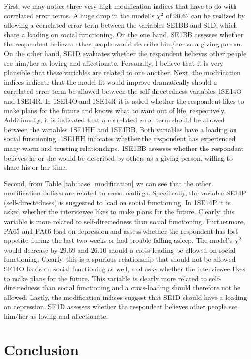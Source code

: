 \documentclass[11pt]{article}
\begin{document}
First, we may notice three very high modification indices that have to do with
correlated error terms.
A huge drop in the model's $\chi^2$ of 90.62 can be realized by allowing a
correlated error term between the variables SE1BB and S1D, which share a loading
on social functioning. On the one hand, SE1BB assesses whether the respondent
believes other people would describe him/her as a giving person. On the other
hand, SE1D evaluates whether the respondent believes other people see him/her as
loving and affectionate. Personally, I believe that it is very plausible that
these variables are related to one another.
Next, the modification indices indicate that the model fit would improve
dramatically should a correlated error term be allowed between the
self-directedness variables 1SE14O and 1SE14R. In 1SE14O and 1SE14R it is asked
whether the respondent likes to make plans for the future and knows what to want
out of life, respectively.
Additionally, it is indicated that a correlated error term
should be allowed between the variables 1SE1HH and 1SE1BB. Both variables have a
loading on social functioning. 1SE1HH indicates whether the respondent has
experienced many warm and trusting relationships. 1SE1BB assesses whether the
respondent believes he or she would be described by others as a giving person,
willing to share his or her time.

Second, from Table \ref{tab:base_modification} we can see that the other
modification indices are related to cross-loadings.
Specifically, the variable SE14P (self-directedness) is suggested to
load on social functioning. In 1SE14P it is asked whether the interviewee likes
to make plans for the future. Clearly, this variable is more related to
self-directedness than social functioning.
Furthermore, PA65 and PA66 load on depression and assess whether the respondent
has lost appetite during the last two weeks or had trouble falling asleep. The
model's $\chi^2$ would decrease by 29.69 and 26.10 should a cross-loading be
allowed on social functioning. Clearly, this is a spurious relationship that
should not be allowed.
SE14O loads on social functioning as well, and asks whether the interviewee
likes to make plans for the future. This variable is clearly more related to
self-directedness than social functioning and a cross-loading should therefore
not be allowed.
Lastly, the modification indices suggest that SE1D should have a loading on
depression. SE1D assesses whether the respondent believes other people see
him/her as loving and affectionate.

\section{Conclusion}
\end{document}
